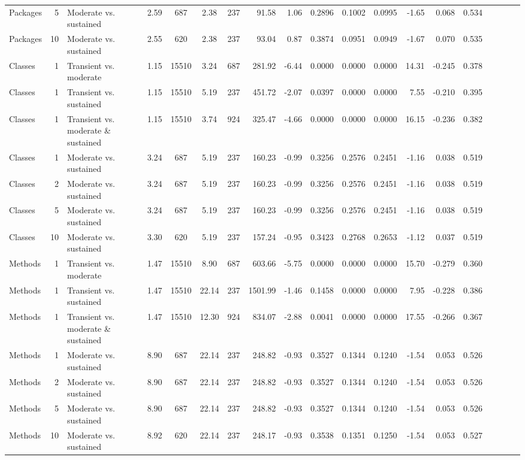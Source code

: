 \begin{table}[H]
{\begin{tabular}{l r p{4cm} c c c c r r r r r r r r r r r r}
Packages & 5 & Moderate vs. sustained &  2.59 & 687 & 2.38 & 237 & 91.58 & 1.06 & 0.2896 & 0.1002 & 0.0995 & -1.65 & 0.068 & 0.534 \\ 
Packages & 10 & Moderate vs. sustained &  2.55 & 620 & 2.38 & 237 & 93.04 & 0.87 & 0.3874 & 0.0951 & 0.0949 & -1.67 & 0.070 & 0.535 \\ 
Classes & 1 & Transient vs. moderate &  1.15 & 15510 & 3.24 & 687 & 281.92 & -6.44 & 0.0000 & 0.0000 & 0.0000 & 14.31 & -0.245 & 0.378 \\ 
Classes & 1 & Transient vs. sustained &  1.15 & 15510 & 5.19 & 237 & 451.72 & -2.07 & 0.0397 & 0.0000 & 0.0000 & 7.55 & -0.210 & 0.395 \\ 
Classes & 1 & Transient vs. moderate \& sustained &  1.15 & 15510 & 3.74 & 924 & 325.47 & -4.66 & 0.0000 & 0.0000 & 0.0000 & 16.15 & -0.236 & 0.382 \\ 
Classes & 1 & Moderate vs. sustained &  3.24 & 687 & 5.19 & 237 & 160.23 & -0.99 & 0.3256 & 0.2576 & 0.2451 & -1.16 & 0.038 & 0.519 \\ 
Classes & 2 & Moderate vs. sustained &  3.24 & 687 & 5.19 & 237 & 160.23 & -0.99 & 0.3256 & 0.2576 & 0.2451 & -1.16 & 0.038 & 0.519 \\ 
Classes & 5 & Moderate vs. sustained &  3.24 & 687 & 5.19 & 237 & 160.23 & -0.99 & 0.3256 & 0.2576 & 0.2451 & -1.16 & 0.038 & 0.519 \\ 
Classes & 10 & Moderate vs. sustained &  3.30 & 620 & 5.19 & 237 & 157.24 & -0.95 & 0.3423 & 0.2768 & 0.2653 & -1.12 & 0.037 & 0.519 \\ 
Methods & 1 & Transient vs. moderate &  1.47 & 15510 & 8.90 & 687 & 603.66 & -5.75 & 0.0000 & 0.0000 & 0.0000 & 15.70 & -0.279 & 0.360 \\ 
Methods & 1 & Transient vs. sustained &  1.47 & 15510 & 22.14 & 237 & 1501.99 & -1.46 & 0.1458 & 0.0000 & 0.0000 & 7.95 & -0.228 & 0.386 \\ 
Methods & 1 & Transient vs. moderate \& sustained &  1.47 & 15510 & 12.30 & 924 & 834.07 & -2.88 & 0.0041 & 0.0000 & 0.0000 & 17.55 & -0.266 & 0.367 \\ 
Methods & 1 & Moderate vs. sustained &  8.90 & 687 & 22.14 & 237 & 248.82 & -0.93 & 0.3527 & 0.1344 & 0.1240 & -1.54 & 0.053 & 0.526 \\ 
Methods & 2 & Moderate vs. sustained &  8.90 & 687 & 22.14 & 237 & 248.82 & -0.93 & 0.3527 & 0.1344 & 0.1240 & -1.54 & 0.053 & 0.526 \\ 
Methods & 5 & Moderate vs. sustained &  8.90 & 687 & 22.14 & 237 & 248.82 & -0.93 & 0.3527 & 0.1344 & 0.1240 & -1.54 & 0.053 & 0.526 \\ 
Methods & 10 & Moderate vs. sustained &  8.92 & 620 & 22.14 & 237 & 248.17 & -0.93 & 0.3538 & 0.1351 & 0.1250 & -1.54 & 0.053 & 0.527 \\ 
\bottomrule
\end{tabular}%
} 
\label{tab:codebase_graph_latex_repository_graph_component_time_series_statistical_significance_test} 
\end{table}
\newpage 

